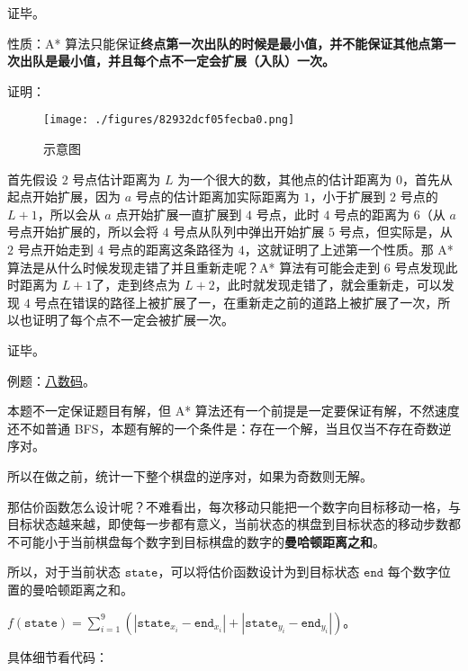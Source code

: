 证毕。

性质：A* 算法只能保证\textbf{终点第一次出队的时候是最小值，并不能保证其他点第一次出队是最小值，并且每个点不一定会扩展（入队）一次。}

证明：

\begin{figure}[ht]
\centering
\texttt{[image: ./figures/82932dcf05fecba0.png]}
\caption{示意图} \label{fig_Astar_1}
\end{figure}

首先假设 $2$ 号点估计距离为 $L$ 为一个很大的数，其他点的估计距离为 $0$，首先从起点开始扩展，因为 $a$ 号点的估计距离加实际距离为 $1$，小于扩展到 $2$ 号点的 $L + 1$，所以会从 $a$ 点开始扩展一直扩展到 $4$ 号点，此时 $4$ 号点的距离为 $6$（从 $a$ 号点开始扩展的，所以会将 $4$ 号点从队列中弹出开始扩展 $5$ 号点，但实际是，从 $2$ 号点开始走到 $4$ 号点的距离这条路径为 $4$，这就证明了上述第一个性质。那 A* 算法是从什么时候发现走错了并且重新走呢？A* 算法有可能会走到 $6$ 号点发现此时距离为 $L + 1$了，走到终点为 $L + 2$，此时就发现走错了，就会重新走，可以发现 $4$ 号点在错误的路径上被扩展了一，在重新走之前的道路上被扩展了一次，所以也证明了每个点不一定会被扩展一次。 

证毕。

例题：\href{http://poj.org/problem?id=1077}{八数码}。

本题不一定保证题目有解，但 A* 算法还有一个前提是一定要保证有解，不然速度还不如普通 BFS，本题有解的一个条件是：存在一个解，当且仅当不存在奇数逆序对。

所以在做之前，统计一下整个棋盘的逆序对，如果为奇数则无解。

那估价函数怎么设计呢？不难看出，每次移动只能把一个数字向目标移动一格，与目标状态越来越，即使每一步都有意义，当前状态的棋盘到目标状态的移动步数都不可能小于当前棋盘每个数字到目标棋盘的数字的\textbf{曼哈顿距离之和}。

所以，对于当前状态 $\texttt{state}$，可以将估价函数设计为到目标状态 $\texttt{end}$ 每个数字位置的曼哈顿距离之和。

$f(\texttt{state}) = \sum^9_{i = 1}(|\texttt{state}_{x_{i}} - \texttt{end}_{x_{i}}| + |\texttt{state}_{y_{i}} - \texttt{end}_{y_{i}}|)$。

具体细节看代码：

